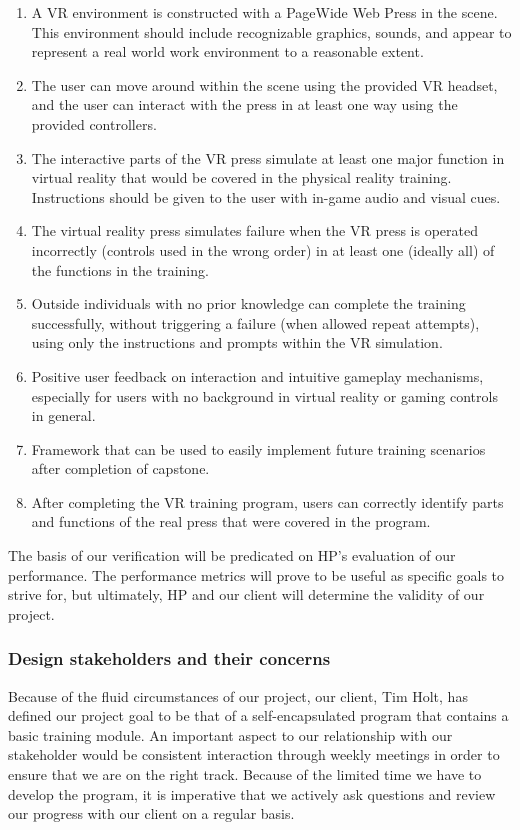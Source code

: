 \documentclass[onecolumn, draftclsnofoot,10pt, compsoc]{IEEEtran}
\begin{document}
\begin{enumerate}
\item A VR environment is constructed with a PageWide Web Press in the scene. This environment should include recognizable graphics, sounds, and appear to represent a real world work environment to a reasonable extent.

\item The user can move around within the scene using the provided VR headset, and the user can interact with the press in at least one way using the provided controllers. 

\item The interactive parts of the VR press simulate at least one major function in virtual reality that would be covered in the physical reality training. Instructions should be given to the user with in-game audio and visual cues.  

\item The virtual reality press simulates failure when the VR press is operated incorrectly (controls used in the wrong order) in at least one (ideally all) of the functions in the training.

\item Outside individuals with no prior knowledge can complete the training successfully, without triggering a failure (when allowed repeat attempts), using only the instructions and prompts within the VR simulation. 

\item Positive user feedback on interaction and intuitive gameplay mechanisms, especially for users with no background in virtual reality or gaming controls in general.

\item Framework that can be used to easily implement future training scenarios after completion of capstone.

\item After completing the VR training program, users can correctly identify parts and functions of the real press that were covered in the program.
\end{enumerate}

The basis of our verification will be predicated on HP's evaluation of our performance. The performance metrics will prove to be useful as specific goals to strive for, but ultimately, HP and our client will determine the validity of our project. 

\subsubsection{Design stakeholders and their concerns}
Because of the fluid circumstances of our project, our client, Tim Holt, has defined our project goal to be that of a self-encapsulated program that contains a basic training module. An important aspect to our relationship with our stakeholder would be consistent interaction through weekly meetings in order to ensure that we are on the right track. Because of the limited time we have to develop the program, it is imperative that we actively ask questions and review our progress with our client on a regular basis. 
\end{document}
